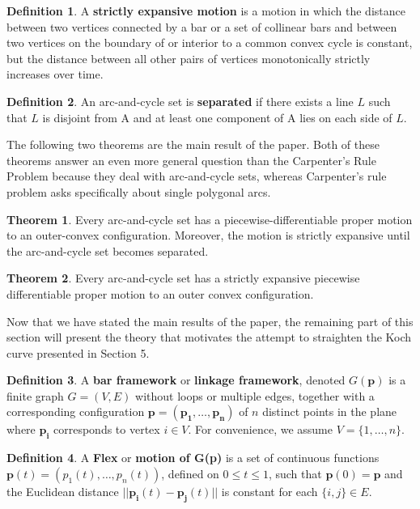 \documentclass{article}
\theoremstyle{definition}
\newtheorem{definition}{Definition}[section]
\newtheorem{theorem}{Theorem}[section]
\begin{document}
\begin{definition}
    A \textbf{strictly expansive motion} is a motion in which the distance between two vertices connected by a bar or a set of collinear bars and between two vertices on the boundary of or interior to a common convex cycle is constant, but the distance between all other pairs of vertices monotonically strictly increases over time.
\end{definition}
\begin{definition}
    An arc-and-cycle set is \textbf{separated} if there exists a line $L$ such that $L$ is disjoint from A and at least one component of A lies on each side of $L$.
\end{definition}
\noindent The following two theorems are the main result of the paper. Both of these theorems answer an even more general question than the Carpenter's Rule Problem because they deal with arc-and-cycle sets, whereas Carpenter's rule problem asks specifically about single polygonal arcs.
\begin{theorem}
    Every arc-and-cycle set has a piecewise-differentiable proper motion to an outer-convex configuration. Moreover, the motion is strictly expansive until the arc-and-cycle set becomes separated.
\end{theorem}
\begin{theorem}
    Every arc-and-cycle set has a strictly expansive piecewise differentiable proper motion to an outer convex configuration.
\end{theorem}
\noindent Now that we have stated the main results of the paper, the remaining part of this section will present the theory that motivates the attempt to straighten the Koch curve presented in Section 5.
\begin{definition}
    A \textbf{bar framework} or \textbf{linkage framework}, denoted $G(\mathbf{p})$ is a finite graph $G = (V, E)$ without loops or multiple edges, together with a corresponding configuration $\mathbf{p} = (\mathbf{p_1}, \ldots, \mathbf{p_n})$ of $n$ distinct points in the plane where $\mathbf{p_i}$ corresponds to vertex $i \in V$. For convenience, we assume $V = \{1, \ldots, n\}$.
\end{definition}
\begin{definition}
    A \textbf{Flex} or \textbf{motion of G(p)} is a set of continuous functions $\mathbf{p}(t) = (p_1(t), \ldots, p_n(t))$, defined on $0 \leq t \leq 1$, such that $\mathbf{p}(0) = \mathbf{p}$ and the Euclidean distance $||\mathbf{p_i}(t) - \mathbf{p_j}(t)||$ is constant for each $\{i, j\} \in E$.
\end{definition}
\end{document}
